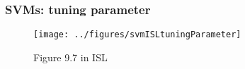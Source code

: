 \documentclass[12pt]{beamer}
\begin{document}
\begin{frame}
\frametitle{SVMs: tuning parameter}
\begin{figure}
\texttt{[image: ../figures/svmISLtuningParameter]}
\caption*{Figure 9.7 in ISL}
\end{figure}
\end{frame}
%
%
%
%
%
%
\end{document}
